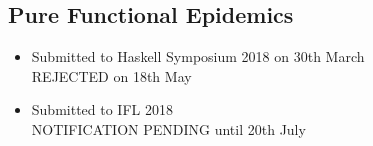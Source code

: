 \begin{appendices}

\chapter{Pure Functional Epidemics}
\label{app:pfe}
\begin{itemize}
	\item Submitted to Haskell Symposium 2018 on 30th March \\ REJECTED on 18th May
	\item Submitted to IFL 2018 \\ NOTIFICATION PENDING until 20th July
\end{itemize}





\end{appendices}